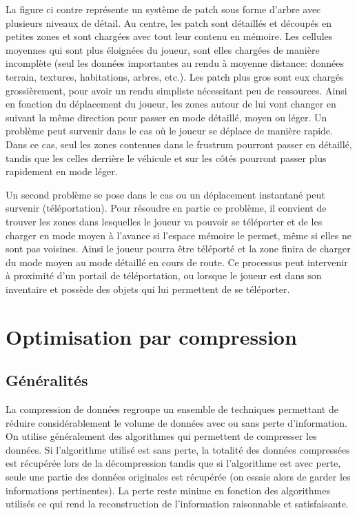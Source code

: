 \documentclass[a4paper, 11pt]{article} %
\begin{document}
La figure ci contre représente un système de patch sous forme d'arbre avec plusieurs niveaux de détail. Au centre, les patch sont détaillés et découpés en petites zones et sont chargées avec tout leur contenu en mémoire. Les cellules moyennes qui sont plus éloignées du joueur, sont elles chargées de manière incomplète (seul les données importantes au rendu à moyenne distance: données terrain, textures, habitations, arbres, etc.). Les patch plus gros sont eux chargés grossièrement, pour avoir un rendu simpliste nécessitant peu de ressources. Ainsi en fonction du déplacement du joueur, les zones autour de lui vont changer en suivant la même direction pour passer en mode détaillé, moyen ou léger. Un problème peut survenir dans le cas où le joueur se déplace de manière rapide. Dans ce cas, seul les zones contenues dans le frustrum pourront passer en détaillé, tandis que les celles derrière le véhicule et sur les côtés pourront passer plus rapidement en mode léger.

Un second problème se pose dans le cas ou un déplacement instantané peut survenir (téléportation). Pour résoudre en partie ce problème, il convient de trouver les zones dans lesquelles le joueur va pouvoir se téléporter et de les charger en mode moyen à l'avance si l'espace mémoire le permet, même si elles ne sont pas voisines. Ainsi le joueur pourra être téléporté et la zone finira de charger du mode moyen au mode détaillé en cours de route. Ce processus peut intervenir à proximité d'un portail de téléportation, ou lorsque le joueur est dans son inventaire et possède des objets qui lui permettent de se téléporter.

\newpage
\section*{Optimisation par compression}
\subsection*{Généralités}
La compression de données regroupe un ensemble de techniques permettant de réduire considérablement le volume de données avec ou sans perte d'information. On utilise généralement des algorithmes qui permettent de compresser les données. Si l'algorithme utilisé est sans perte, la totalité des données compressées est récupérée lors de la décompression tandis que si l'algorithme est avec perte, seule une partie des données originales est récupérée (on essaie alors de garder les informations pertinentes). La perte reste minime en fonction des algorithmes utilisés ce qui rend la reconstruction de l'information raisonnable et satisfaisante. 
\end{document}
